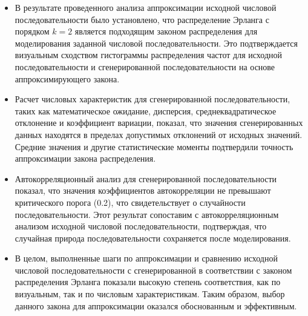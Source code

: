 \begin{itemize}
	\item В результате проведенного анализа аппроксимации исходной числовой последовательности было установлено, что распределение Эрланга с порядком \( k = 2 \) является подходящим законом распределения для моделирования заданной числовой последовательности. Это подтверждается визуальным сходством гистограммы распределения частот для исходной последовательности и сгенерированной последовательности на основе аппроксимирующего закона.

	\item Расчет числовых характеристик для сгенерированной последовательности, таких как математическое ожидание, дисперсия, среднеквадратическое отклонение и коэффициент вариации, показал, что значения сгенерированных данных находятся в пределах допустимых отклонений от исходных значений. Средние значения и другие статистические моменты подтвердили точность аппроксимации закона распределения.

	\item Автокорреляционный анализ для сгенерированной последовательности показал, что значения коэффициентов автокорреляции не превышают критического порога (0.2), что свидетельствует о случайности последовательности. Этот результат сопоставим с автокорреляционным анализом исходной числовой последовательности, подтверждая, что случайная природа последовательности сохраняется после моделирования.

	\item В целом, выполненные шаги по аппроксимации и сравнению исходной числовой последовательности с сгенерированной в соответствии с законом распределения Эрланга показали высокую степень соответствия, как по визуальным, так и по числовым характеристикам. Таким образом, выбор данного закона для аппроксимации оказался обоснованным и эффективным.
\end{itemize}
